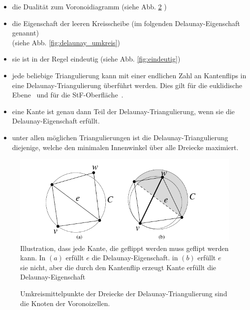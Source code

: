 \begin{itemize}
    \item die Dualität zum Voronoidiagramm (siehe Abb. \ref{fig:delaunay_voronoi}  ) \cite{indermitte:2001:voronoi,aurenhammer:2000:voronoi}
    \item die Eigenschaft der leeren Kreisscheibe (im folgenden Delaunay-Eigenschaft genannt)\\(siehe Abb. \ref{fig:delaunay_umkreis})
    \item sie ist in der Regel eindeutig (siehe Abb. \ref{fig:eindeutig})
    \item jede beliebige Triangulierung kann mit einer endlichen Zahl an Kantenflips in eine Delaunay-Triangulierung überführt werden. Dies gilt für die euklidische Ebene~\cite{shewchuk:1997:delaunay} und für die StF-Oberfläche~\cite{Bobenko:2007:LaplaceBeltrami}.
    \item eine Kante ist genau dann Teil der Delaunay-Triangulierung,  wenn sie die Delaunay-Eigenschaft erfüllt. 
    \item unter allen möglichen Triangulierungen ist die Delaunay-Triangulierung diejenige, welche den minimalen Innenwinkel über alle Dreiecke maximiert. 
\end{itemize}
 
 
 \begin{figure}[H]
    \centering
    \includegraphics[width=5in]{images/lokal_delaunay.png}
    \caption{Illustration, dass jede Kante, die geflippt werden muss geflipt werden kann. In $(a)$ erfüllt $e$ die Delaunay-Eigenschaft. in $(b)$ erfüllt $e$ sie nicht, aber die durch den Kantenflip erzeugt Kante erfüllt die Delaunay-Eigenschaft~\cite{shewchuk:1997:delaunay} }
    \label{fig:lokal_delaunay}
\end{figure}


\begin{figure}[h]%
    \centering
  
  \caption{ Umkreismittelpunkte der Dreiecke der Delaunay-Triangulierung sind die Knoten  der Voronoizellen.~\cite{Hferee:2011:delaunay-voronoi}}
  \label{fig:delaunay_voronoi}
\end{figure}

